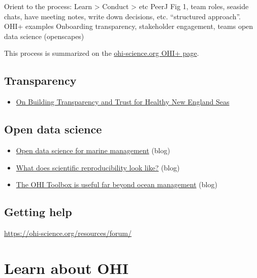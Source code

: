 \documentclass[
]{book}
\providecommand{\tightlist}{%
  \setlength{\itemsep}{0pt}\setlength{\parskip}{0pt}}
\begin{document}
Orient to the process: Learn \textgreater{} Conduct \textgreater{} etc
PeerJ Fig 1, team roles, seaside chats, have meeting notes, write down decisions, etc. ``structured approach''.
OHI+ examples
Onboarding
transparency, stakeholder engagement, teams open data science (openscapes)

This process is summarized on the \href{https://ohi-science.org/projects/ohi-plus/}{ohi-science.org OHI+ page}.

\hypertarget{transparency}{%
\section{Transparency}\label{transparency}}

\begin{itemize}
\tightlist
\item
  \href{https://ohi-science.org/news/transparent-trust-new-england-seas}{On Building Transparency and Trust for Healthy New England Seas}
\end{itemize}

\hypertarget{open-data-science}{%
\section{Open data science}\label{open-data-science}}

\begin{itemize}
\tightlist
\item
  \href{https://ohi-science.org/news/ohi-and-open-data-science}{Open data science for marine management} (blog)
\item
  \href{https://ohi-science.org/news/scientific-reproducibility-with-fellows}{What does scientific reproducibility look like?} (blog)
\item
  \href{https://ohi-science.org/news/what-is-the-ohi-toolbox}{The OHI Toolbox is useful far beyond ocean management} (blog)
\end{itemize}

\hypertarget{getting-help}{%
\section{Getting help}\label{getting-help}}

\url{https://ohi-science.org/resources/forum/}

\hypertarget{ohi}{%
\chapter{Learn about OHI}\label{ohi}}
\end{document}
